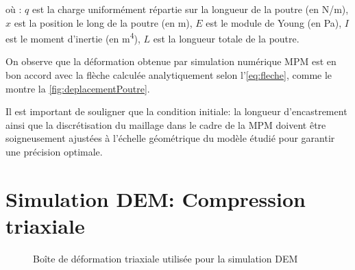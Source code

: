 \documentclass[a4paper,12pt]{report}
\begin{document}
où :
$q$ est la charge uniformément répartie sur la longueur de la poutre (en N/m),
$x$ est la position le long de la poutre (en m),
$E$ est le module de Young (en Pa),
$I$ est le moment d'inertie (en m\textsuperscript{4}),
$L$ est la longueur totale de la poutre.

On observe que la déformation obtenue par simulation numérique MPM est en bon accord avec la flèche calculée analytiquement selon l'\autoref{eq:fleche}, comme le montre la \autoref{fig:deplacementPoutre}.

Il est important de souligner que la condition initiale: la longueur d'encastrement ainsi que la discrétisation du maillage dans le cadre de la MPM doivent être soigneusement ajustées à l’échelle géométrique du modèle étudié pour garantir une précision optimale.




\section{Simulation DEM: Compression triaxiale}

\begin{figure}[h]
    \centering
    \caption{Boîte de déformation triaxiale utilisée pour la simulation DEM}
    \label{fig:boiteDeformation}
\end{figure}
\end{document}
